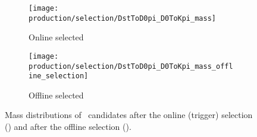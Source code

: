 \begin{figure}
  \begin{subfigure}[b]{0.5\textwidth}
    \centering
    \texttt{[image: production/selection/DstToD0pi\_D0ToKpi\_mass]}
    \caption{Online selected}
    \label{fig:prod:sel:DstToD0pi_D0ToKpi:online}
  \end{subfigure}
  \begin{subfigure}[b]{0.5\textwidth}
    \centering
    \texttt{[image: production/selection/DstToD0pi\_D0ToKpi\_mass\_offline\_selection]}
    \caption{Offline selected}
    \label{fig:prod:sel:DstToD0pi_D0ToKpi:offline}
  \end{subfigure}
  \caption{%
    Mass distributions of \DstToDzpi\ candidates after the online (trigger) 
    selection () and after the 
    offline selection ().
  }
  \label{fig:prod:sel:DstToD0pi_D0ToKpi}
\end{figure}

\begin{table}
  \caption{%
    Number of candidates before and after the offline selection for each charm 
    candidate under study.
  }
  \label{tab:prod:sel:candidates}
  \centering
  
\end{table}
